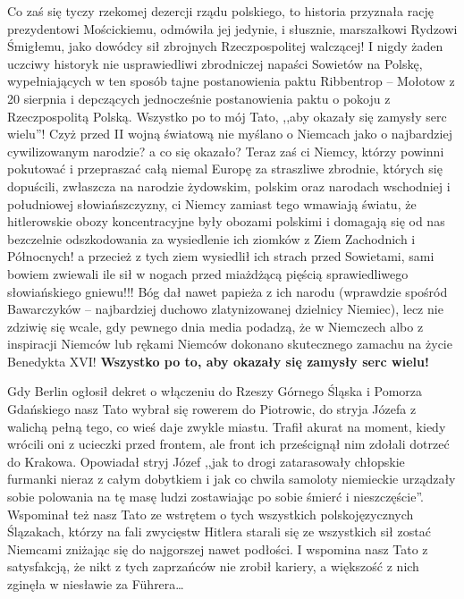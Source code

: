 Co zaś się tyczy rzekomej dezercji rządu polskiego, to historia przyznała rację prezydentowi Mościckiemu, odmówiła jej jedynie, i słusznie, marszałkowi Rydzowi Śmigłemu, jako dowódcy sił zbrojnych Rzeczpospolitej walczącej! I nigdy żaden uczciwy historyk nie usprawiedliwi zbrodniczej napaści Sowietów na Polskę, wypełniających w ten sposób tajne postanowienia paktu Ribbentrop -- Mołotow z 20 sierpnia i depczących jednocześnie postanowienia paktu o pokoju z Rzeczpospolitą Polską. Wszystko po to mój Tato, ,,aby okazały się zamysły serc wielu''! Czyż przed II wojną światową nie myślano o Niemcach jako o najbardziej cywilizowanym narodzie? a co się okazało? Teraz zaś ci Niemcy, którzy powinni pokutować i przepraszać całą niemal Europę za straszliwe zbrodnie, których się dopuścili, zwłaszcza na narodzie żydowskim, polskim oraz narodach wschodniej i południowej słowiańszczyzny, ci Niemcy zamiast tego wmawiają światu, że hitlerowskie obozy koncentracyjne były obozami polskimi i domagają się od nas bezczelnie odszkodowania za wysiedlenie ich ziomków z Ziem Zachodnich i Północnych! a przecież z tych ziem wysiedlił ich strach przed Sowietami, sami bowiem zwiewali ile sił w nogach przed miażdżącą pięścią sprawiedliwego słowiańskiego gniewu!!! Bóg dał nawet papieża z ich narodu (wprawdzie spośród Bawarczyków – najbardziej duchowo zlatynizowanej dzielnicy Niemiec), lecz nie zdziwię się wcale, gdy pewnego dnia media podadzą, że w Niemczech albo z inspiracji Niemców lub rękami Niemców dokonano skutecznego zamachu na życie Benedykta XVI! \textbf{Wszystko po to, aby okazały się zamysły serc wielu!}

Gdy Berlin ogłosił dekret o włączeniu do Rzeszy Górnego Śląska i Pomorza Gdańskiego nasz Tato wybrał się rowerem do Piotrowic, do stryja Józefa z walichą pełną tego, co wieś daje zwykle miastu. Trafił akurat na moment, kiedy wrócili oni z ucieczki przed frontem, ale front ich prześcignął nim zdołali dotrzeć do Krakowa. Opowiadał stryj Józef ,,jak to drogi zatarasowały chłopskie furmanki nieraz z całym dobytkiem i jak co chwila samoloty niemieckie urządzały sobie polowania na tę masę ludzi zostawiając po sobie śmierć i nieszczęście''. Wspominał też nasz Tato ze wstrętem o tych wszystkich polskojęzycznych Ślązakach, którzy na fali zwycięstw Hitlera starali się ze wszystkich sił zostać Niemcami zniżając się do najgorszej nawet podłości. I wspomina nasz Tato z satysfakcją, że nikt z tych zaprzańców nie zrobił kariery, a większość z nich zginęła w niesławie za Führera\ldots

